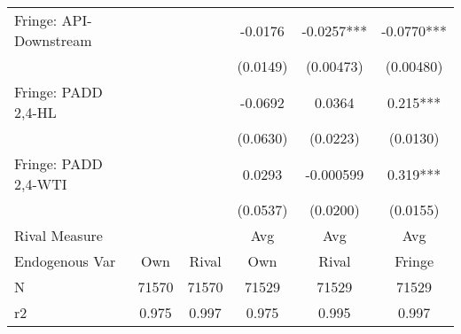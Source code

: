 {\begin{tabular}{l*{5}{c}}
\addlinespace
Fringe: API-Downstream&            &            &  -0.0176   &  -0.0257***&  -0.0770***\\
                &            &            & (0.0149)   &(0.00473)   &(0.00480)   \\
\addlinespace
Fringe: PADD 2,4-HL&            &            &  -0.0692   &   0.0364   &    0.215***\\
                &            &            & (0.0630)   & (0.0223)   & (0.0130)   \\
\addlinespace
Fringe: PADD 2,4-WTI&            &            &   0.0293   &-0.000599   &    0.319***\\
                &            &            & (0.0537)   & (0.0200)   & (0.0155)   \\
\midrule
Rival Measure   &            &            &      Avg   &      Avg   &      Avg   \\
Endogenous Var  &      Own   &    Rival   &      Own   &    Rival   &   Fringe   \\
N               &    71570   &    71570   &    71529   &    71529   &    71529   \\
r2              &    0.975   &    0.997   &    0.975   &    0.995   &    0.997   \\
\bottomrule
\end{tabular}
}
